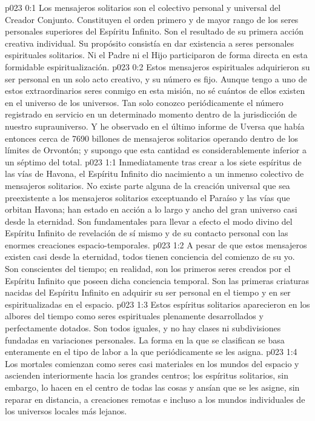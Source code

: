 \author{Consejero divino}
\vs p023 0:1 Los mensajeros solitarios son el colectivo personal y universal del Creador Conjunto. Constituyen el orden primero y de mayor rango de los seres personales superiores del Espíritu Infinito. Son el resultado de su primera acción creativa individual. Su propósito consistía en dar existencia a seres personales espirituales solitarios. Ni el Padre ni el Hijo participaron de forma directa en esta formidable espiritualización.
\vs p023 0:2 Estos mensajeros espirituales adquirieron su ser personal en un solo acto creativo, y su número es fijo. Aunque tengo a uno de estos extraordinarios seres conmigo en esta misión, no sé cuántos de ellos existen en el universo de los universos. Tan solo conozco periódicamente el número registrado en servicio en un determinado momento dentro de la jurisdicción de nuestro suprauniverso. Y he observado en el último informe de Uversa que había entonces cerca de 7690 billones de mensajeros solitarios operando dentro de los límites de Orvontón; y supongo que esta cantidad es considerablemente inferior a un séptimo del total.
\vs p023 1:1 Inmediatamente tras crear a los siete espíritus de las vías de Havona, el Espíritu Infinito dio nacimiento a un inmenso colectivo de mensajeros solitarios. No existe parte alguna de la creación universal que sea preexistente a los mensajeros solitarios exceptuando el Paraíso y las vías que orbitan Havona; han estado en acción a lo largo y ancho del gran universo casi desde la eternidad. Son fundamentales para llevar a efecto el modo divino del Espíritu Infinito de revelación de sí mismo y de su contacto personal con las enormes creaciones espacio\hyp{}temporales.
\vs p023 1:2 A pesar de que estos mensajeros existen casi desde la eternidad, todos tienen conciencia del comienzo de su yo. Son conscientes del tiempo; en realidad, son los primeros seres creados por el Espíritu Infinito que poseen dicha conciencia temporal. Son las primeras criaturas nacidas del Espíritu Infinito en adquirir su ser personal en el tiempo y en ser espiritualizadas en el espacio.
\vs p023 1:3 Estos espíritus solitarios aparecieron en los albores del tiempo como seres espirituales plenamente desarrollados y perfectamente dotados. Son todos iguales, y no hay clases ni subdivisiones fundadas en variaciones personales. La forma en la que se clasifican se basa enteramente en el tipo de labor a la que periódicamente se les asigna.
\vs p023 1:4 Los mortales comienzan como seres casi materiales en los mundos del espacio y ascienden interiormente hacia los grandes centros; los espíritus solitarios, sin embargo, lo hacen en el centro de todas las cosas y ansían que se les asigne, sin reparar en distancia, a creaciones remotas e incluso a los mundos individuales de los universos locales más lejanos.

